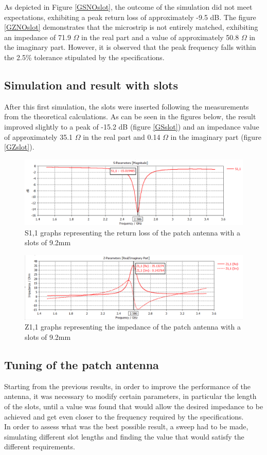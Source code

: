 \documentclass[]{article}
\begin{document}
As depicted in Figure \eqref{GSNOslot}, the outcome of the simulation did not meet expectations, exhibiting a peak return loss of approximately -9.5 dB. The figure \eqref{GZNOslot} demonstrates that the microstrip is not entirely matched, exhibiting an impedance of 71.9 $\Omega$ in the real part and a value of approximately 50.8 $\Omega$ in the imaginary part. However, it is observed that the peak frequency falls within the 2.5\% tolerance stipulated by the specifications.
\subsection{Simulation and result with slots}
After this first simulation, the slots were inserted following the measurements from the theoretical calculations. As can be seen in the figures below, the result improved slightly to a peak of -15.2 dB (figure \eqref{GSslot}) and an impedance value of approximately 35.1 $\Omega$ in the real part and 0.14  $\Omega$  in the imaginary part (figure \eqref{GZslot}).
 \begin{figure}[h]
	\centering
	\includegraphics[width=0.8\linewidth]{img/img5}
	\caption{S1,1 graphs representing the return loss of the patch antenna with a slots of 9.2mm}
	\label{GSslot}
\end{figure}

\begin{figure}[h]
	\centering
	\includegraphics[width=0.8\linewidth]{img/img6}
	\caption{Z1,1 graphs representing the impedance of the patch antenna with a slots of 9.2mm}
	\label{GZslot}
\end{figure}
 \subsection{Tuning of the patch antenna}
 Starting from the previous results, in order to improve the performance of the antenna, it was necessary to modify certain parameters, in particular the length of the slots, until a value was found that would allow the desired impedance to be achieved and get even closer to the frequency required by the specifications.\\
  In order to assess what was the best possible result, a sweep had to be made, simulating different slot lengths and finding the value that would satisfy the different requirements.\\
  
\end{document}
